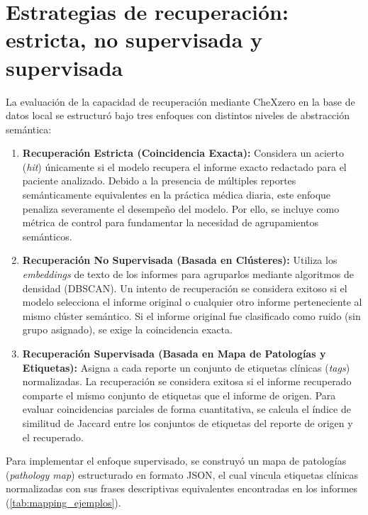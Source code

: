 \documentclass[../tesis.tex]{subfiles}
\begin{document}
\section{Estrategias de recuperación: estricta, no supervisada y supervisada}
\label{sec:estrategias_retrieval}

La evaluación de la capacidad de recuperación mediante CheXzero en la base de datos local se estructuró bajo tres enfoques con distintos niveles de abstracción semántica:

\begin{enumerate}
    \item \textbf{Recuperación Estricta (Coincidencia Exacta):} Considera un acierto (\textit{hit}) únicamente si el modelo recupera el informe exacto redactado para el paciente analizado. Debido a la presencia de múltiples reportes semánticamente equivalentes en la práctica médica diaria, este enfoque penaliza severamente el desempeño del modelo. Por ello, se incluye como métrica de control para fundamentar la necesidad de agrupamientos semánticos.
    
    \item \textbf{Recuperación No Supervisada (Basada en Clústeres):} Utiliza los \textit{embeddings} de texto de los informes para agruparlos mediante algoritmos de densidad (DBSCAN). Un intento de recuperación se considera exitoso si el modelo selecciona el informe original o cualquier otro informe perteneciente al mismo clúster semántico. Si el informe original fue clasificado como ruido (sin grupo asignado), se exige la coincidencia exacta.
    
    \item \textbf{Recuperación Supervisada (Basada en Mapa de Patologías y Etiquetas):} Asigna a cada reporte un conjunto de etiquetas clínicas (\textit{tags}) normalizadas. La recuperación se considera exitosa si el informe recuperado comparte el mismo conjunto de etiquetas que el informe de origen. Para evaluar coincidencias parciales de forma cuantitativa, se calcula el índice de similitud de Jaccard entre los conjuntos de etiquetas del reporte de origen y el recuperado.
\end{enumerate}

Para implementar el enfoque supervisado, se construyó un mapa de patologías (\textit{pathology map}) estructurado en formato JSON, el cual vincula etiquetas clínicas normalizadas con sus frases descriptivas equivalentes encontradas en los informes (\autoref{tab:mapping_ejemplos}).
\end{document}
